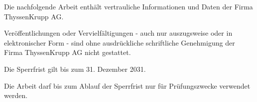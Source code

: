 \documentclass[
12pt, %
oneside, %
english, %
onehalfspacing, %
liststotoc, %
JumpToContents, %
parskip, %
headsepline, %
]{MastersDoctoralThesis} %
\begin{document}
\begin{blocknotice}

  \noindent \sloppy 
  Die nachfolgende Arbeit enthält vertrauliche Informationen und Daten der Firma ThyssenKrupp AG.
  
  Veröffentlichungen oder Vervielfältigungen - auch nur auszugsweise oder in elektronischer Form - sind ohne ausdrückliche schriftliche Genehmigung der Firma ThyssenKrupp AG nicht gestattet.

  Die Sperrfrist gilt bis zum 31. Dezember 2031.

  Die Arbeit darf bis zum Ablauf der Sperrfrist nur für Prüfungszwecke verwendet werden.
  

  



\end{blocknotice}

\cleardoublepage %





\end{document}

